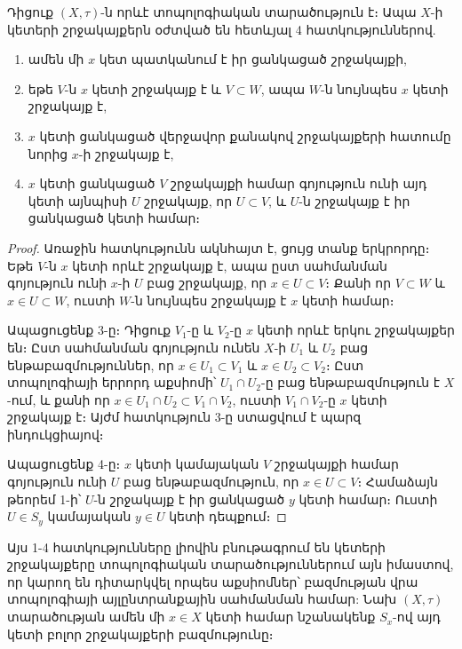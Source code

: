\documentclass[./main.tex]{subfiles}
\begin{document}
\begin{theorem}\label{թեորեմ 2} Դիցուք $(X, \tau )$-ն որևէ տոպոլոգիական տարածություն է։ Ապա $X$-ի կետերի շրջակայքերն օժտված են հետևյալ 4 հատկություններով.
\begin{enumerate}
\item ամեն մի $x$ կետ պատկանում է իր ցանկացած շրջակայքի,
\item եթե $V$-ն $x$ կետի շրջակայք է և $V \subset W$, ապա $W$-ն նույնպես $x$ կետի շրջակայք է,
\item $x$ կետի ցանկացած վերջավոր քանակով շրջակայքերի հատումը նորից $x$-ի շրջակայք է,
\item $x$ կետի ցանկացած $V$ շրջակայքի համար գոյություն ունի այդ կետի այնպիսի $U$ շրջակայք, որ $U \subset V$, և $U$-ն շրջակայք է իր ցանկացած կետի համար։
\end{enumerate}
\end{theorem}
\begin{proof}
Առաջին հատկությունն ակնհայտ է, ցույց տանք երկրորդը։ Եթե $V$-ն $x$ կետի որևէ շրջակայք է, ապա ըստ սահմանման գոյություն ունի $x$-ի $U$ բաց շրջակայք, որ $x \in U \subset V$։ Քանի որ $V \subset W$ և $x \in U \subset W$, ուստի $W$-ն նույնպես շրջակայք է $x$ կետի համար։

Ապացուցենք 3-ը։ Դիցուք $V_1$-ը և $V_2$-ը $x$ կետի որևէ երկու շրջակայքեր են։ \linebreak Ըստ սահմանման գոյություն ունեն $X$-ի $U_1$ և $U_2$ բաց ենթաբազմություններ, որ $x \in U_1 \subset V_1$ և $x \in U_2 \subset V_2$։ Ըստ տոպոլոգիայի երրորդ աքսիոմի՝ $U_1 \cap U_2$-ը բաց ենթաբազմություն է $X$-ում, և քանի որ $x \in U_1 \cap U_2 \subset V_1 \cap V_2 $, ուստի $V_1 \cap V_2 $-ը $x$ կետի շրջակայք է։ Այժմ հատկություն 3-ը ստացվում է պարզ ինդուկցիայով։

Ապացուցենք 4-ը։ $x$ կետի կամայական $V$ շրջակայքի համար գոյություն ունի $U$ բաց ենթաբազմություն, որ $x \in U \subset V$։ Համաձայն թեորեմ 1-ի՝ $U$-ն շրջակայք է իր ցանկացած $y$ կետի համար։ Ուստի $U \in S_y$ կամայական $y \in U $ կետի դեպքում։
\end{proof}
\par Այս 1-4 հատկությունները լիովին բնութագրում են կետերի շրջակայքերը տոպո\-լո\-գիա\-կան տարածություններում այն իմաստով, որ կարող են դիտարկվել որպես աքսիոմներ՝ բազմության վրա տոպոլոգիայի այլընտ\-րանքա\-յին սահմանման համար: Նախ $(X, \tau )$  տարածության ամեն մի $x\in X$ կետի համար նշանակենք $S_x$-ով այդ կետի բոլոր շրջակայքերի բազմությունը։ 
\end{document}
